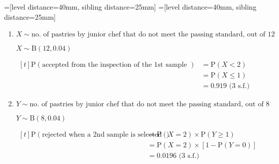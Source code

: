 \documentclass[11pt,a4paper]{book}
\begin{document}
\begin{example}
\begin{enumerate}[label=(\alph*)]
\end{enumerate}

\Solution

\begin{center}
=[level distance=40mm, sibling distance=25mm] 
=[level distance=40mm, sibling distance=25mm] 
\end{center}

\begin{enumerate}[label=(\alph*)] 


\item  $X\sim\text{no. of pastries by junior chef that do not meet the passing standard, out of 12}$

$X\sim\text{B}\left(12,0.04\right)$

$
\begin{aligned}[t]
\text{P}\left(\text{accepted from the inspection of the 1st sample }\right) & =\text{P}\left(X<2\right)\\
 & =\text{P}\left(X\leq1\right)\\
 & =0.919\text{ (3 s.f.)}
\end{aligned}
$

\item  $Y\sim\text{no. of pastries by junior chef that do not meet the passing standard, out of 8}$

$Y\sim\text{B}\left(8,0.04\right)$

$
\begin{aligned}[t]
\text{P}\left(\text{rejected when a 2nd sample is selected for inspection}\right) & =\text{P}\left(X=2\right)\times\text{P}\left(Y\geq1\right)\\
 & =\text{P}\left(X=2\right)\times\left[1-\text{P}\left(Y=0\right)\right]\\
 & =0.0196\text{ (3 s.f.)}
\end{aligned}
$



\end{enumerate}
\end{example}
\end{document}
